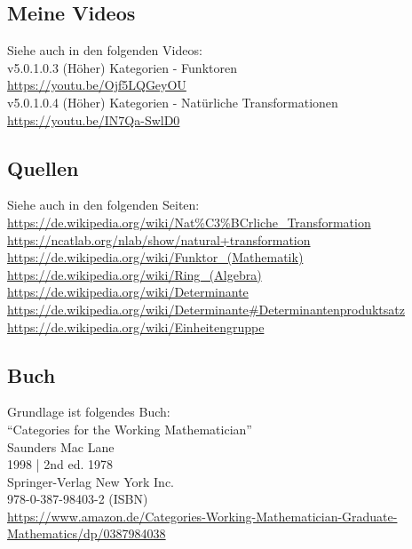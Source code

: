 \documentclass[a4paper]{amsart}
\theoremstyle{definition}
\begin{document}
\subsection*{Meine Videos}
Siehe auch in den folgenden Videos:\\
v5.0.1.0.3 (Höher) Kategorien - Funktoren\\
\url{https://youtu.be/Ojf5LQGeyOU}\\
v5.0.1.0.4 (Höher) Kategorien - Natürliche Transformationen\\
\url{https://youtu.be/IN7Qa-SwlD0}\\

\subsection*{Quellen}
Siehe auch in den folgenden Seiten:\\
\url{https://de.wikipedia.org/wiki/Nat%C3%BCrliche_Transformation}\\
\url{https://ncatlab.org/nlab/show/natural+transformation}\\
\url{https://de.wikipedia.org/wiki/Funktor_(Mathematik)}\\
\url{https://de.wikipedia.org/wiki/Ring_(Algebra)}\\
\url{https://de.wikipedia.org/wiki/Determinante}\\
\url{https://de.wikipedia.org/wiki/Determinante#Determinantenproduktsatz}\\
\url{https://de.wikipedia.org/wiki/Einheitengruppe}

\subsection*{Buch}
Grundlage ist folgendes Buch:\\
"`Categories for the Working Mathematician"'\\
Saunders Mac Lane\\
1998 | 2nd ed. 1978\\
Springer-Verlag New York Inc.\\
978-0-387-98403-2 (ISBN)\\
{\tiny
   \url{https://www.amazon.de/Categories-Working-Mathematician-Graduate-Mathematics/dp/0387984038}}\\
\end{document}
